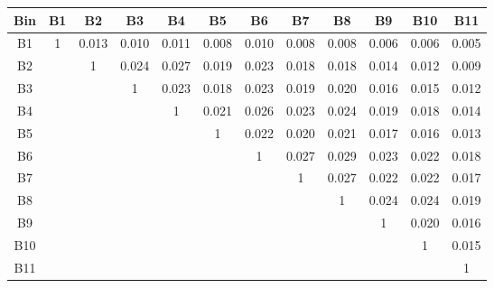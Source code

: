 \begin{tabular}{c@{~~~}c@{~~}c@{~~}c@{~~}c@{~~}c@{~~}c@{~~}c@{~~}c@{~~}c@{~~}c@{~~}c}
\hline
 \hline
Bin	& B1 & B2 & B3 & B4 & B5 & B6 & B7 & B8 & B9 & B10 & B11 \\
\hline
B1	&  1 &  0.013 &  0.010 &  0.011 &  0.008 &  0.010 &  0.008 &  0.008 &  0.006 &  0.006 &  0.005 \\
B2	&   &  1 &  0.024 &  0.027 &  0.019 &  0.023 &  0.018 &  0.018 &  0.014 &  0.012 &  0.009 \\
B3	&   &   &  1 &  0.023 &  0.018 &  0.023 &  0.019 &  0.020 &  0.016 &  0.015 &  0.012 \\
B4	&   &   &   &  1 &  0.021 &  0.026 &  0.023 &  0.024 &  0.019 &  0.018 &  0.014 \\
B5	&   &   &   &   &  1 &  0.022 &  0.020 &  0.021 &  0.017 &  0.016 &  0.013 \\
B6	&   &   &   &   &   &  1 &  0.027 &  0.029 &  0.023 &  0.022 &  0.018 \\
B7	&   &   &   &   &   &   &  1 &  0.027 &  0.022 &  0.022 &  0.017 \\
B8	&   &   &   &   &   &   &   &  1 &  0.024 &  0.024 &  0.019 \\
B9	&   &   &   &   &   &   &   &   &  1 &  0.020 &  0.016 \\
B10	&   &   &   &   &   &   &   &   &   &  1 &  0.015 \\
B11	&   &   &   &   &   &   &   &   &   &   &  1 \\
\hline
 \hline
\end{tabular}
